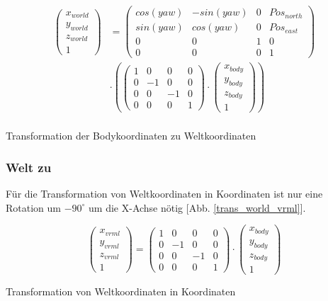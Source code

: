 \begin{ownequation}[H]
\begin{equation}
\begin{split}
\begin{pmatrix}
x_{world} \\ y_{world} \\ z_{world} \\ 1
\end{pmatrix}
& =
\begin{pmatrix}
cos(yaw) & -sin(yaw) & 0 & Pos_{north}\\
sin(yaw) & cos(yaw) & 0 & Pos_{east}\\
0 & 0 & 1 & 0\\
0 & 0 & 0 & 1
\end{pmatrix}\\
&\cdot
\left(
\begin{pmatrix}
1 & 0 & 0& 0\\
0 & -1 & 0& 0\\
0 & 0 & -1& 0\\
0 & 0 & 0 & 1
\end{pmatrix}
\cdot
\begin{pmatrix}
x_{body} \\ y_{body} \\ z_{body} \\ 1
\end{pmatrix}
\right)\\
\end{split}
\end{equation}
\caption{Transformation der Bodykoordinaten zu Weltkoordinaten}
\label{trans_body_world}
\end{ownequation}

\subsubsection{Welt zu \vrml}
Für die Transformation von Weltkoordinaten in \vrml Koordinaten ist nur eine Rotation um $-90^\circ$ um die X-Achse nötig [Abb. \ref{trans_world_vrml}].
\begin{ownequation}[H]
\begin{equation}
\begin{pmatrix}
x_{vrml}\\y_{vrml}\\z_{vrml}\\1
\end{pmatrix}
=
\begin{pmatrix}
1 & 0 & 0& 0\\
0 & -1 & 0& 0\\
0 & 0 & -1& 0\\
0 & 0 & 0 & 1
\end{pmatrix}
\cdot
\begin{pmatrix}
x_{body}\\y_{body}\\z_{body}\\1
\end{pmatrix}
\end{equation}
\caption{Transformation von Weltkoordinaten in \vrml Koordinaten}
\label{trans_world_vrml}
\end{ownequation}